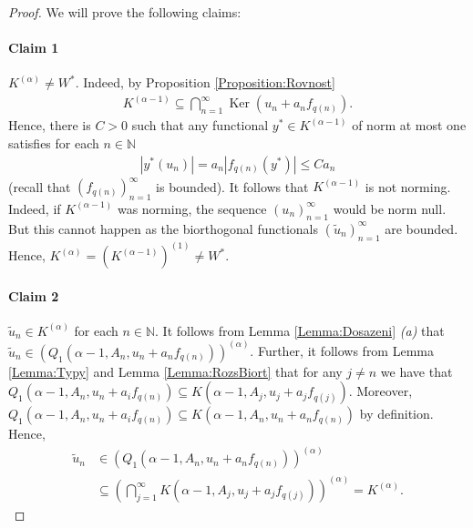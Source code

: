 \documentclass{amsart}
\theoremstyle{definition}
\begin{document}
\begin{proof}
    We will prove the following claims:
    \paragraph*{\textbf{Claim 1}} $K^{(\alpha)} \neq W^*$. Indeed, by Proposition \ref{Proposition:Rovnost}
    \begin{align*}
        K^{(\alpha - 1)} \subseteq \bigcap_{n=1}^\infty \operatorname{Ker}(u_n + a_n f_{q(n)}).
    \end{align*}
    Hence, there is $C>0$ such that any functional $y^* \in K^{(\alpha-1)}$ of norm at most one satisfies for each $n \in \mathbb{N}$
    \begin{align*}
        |y^*(u_n)| = a_n|f_{q(n)}(y^*)| \leq C a_n
    \end{align*}
    (recall that $(f_{q(n)})_{n=1}^\infty$ is bounded). It follows that $K^{(\alpha-1)}$ is not norming. Indeed, if $K^{(\alpha-1)}$ was norming, the sequence $(u_n)_{n=1}^\infty$ would be norm null. But this cannot happen as the biorthogonal functionals $(\widetilde{u}_n)_{n=1}^\infty$ are bounded. Hence, $K^{(\alpha)} = \left( K^{(\alpha-1)} \right)^{(1)} \neq W^*$.
    
    \paragraph*{\textbf{Claim 2}} $\widetilde{u}_n \in K^{(\alpha)}$ for each $n \in \mathbb{N}$. It follows from Lemma \ref{Lemma:Dosazeni} \textit{(a)} that $\widetilde{u}_n \in \left( Q_1(\alpha-1,A_n,u_n + a_nf_{q(n)}) \right)^{(\alpha)}$. Further, it follows from Lemma \ref{Lemma:Typy} and Lemma \ref{Lemma:RozsBiort} that for any $j \neq n$ we have that $Q_1(\alpha-1,A_n,u_n+a_if_{q(n)}) \subseteq K(\alpha-1,A_j,u_j+a_jf_{q(j)})$. Moreover, $Q_1(\alpha-1,A_n,u_n+a_if_{q(n)}) \subseteq K(\alpha-1,A_n,u_n+a_nf_{q(n)})$ by definition. Hence,
    \begin{align*}
        \widetilde{u}_n &\in \left( Q_1(\alpha-1,A_n,u_n + a_nf_{q(n)}) \right)^{(\alpha)} \\
        &\subseteq \left( \bigcap_{j=1}^\infty K(\alpha-1,A_j,u_j + a_jf_{q(j)}) \right)^{(\alpha)} = K^{(\alpha)}.
    \end{align*}
    

\end{proof}
\end{document}
